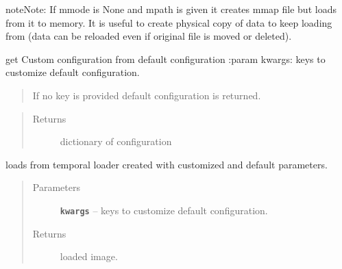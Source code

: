 \documentclass[letterpaper,10pt,english]{sphinxmanual}
\begin{document}
\begin{fulllineitems}
\begin{quote}
\begin{description}
\begin{itemize}
\end{itemize}

\end{description}\end{quote}

\begin{notice}{note}{Note:}
If mmode is None and mpath is given it creates mmap file but loads from it to memory.
It is useful to create physical copy of data to keep loading from (data can be reloaded
even if original file is moved or deleted).
\end{notice}

\begin{fulllineitems}
\label{RRtoolbox.lib:RRtoolbox.lib.image.imLoader.getConfiguration}
get Custom configuration from default configuration
:param kwargs: keys to customize default configuration.
\begin{quote}

If no key is provided default configuration is returned.
\end{quote}
\begin{quote}\begin{description}
\item[{Returns}] \leavevmode
dictionary of configuration

\end{description}\end{quote}

\end{fulllineitems}


\begin{fulllineitems}
\label{RRtoolbox.lib:RRtoolbox.lib.image.imLoader.temp}
loads from temporal loader created with customized and default parameters.
\begin{quote}\begin{description}
\item[{Parameters}] \leavevmode
\textbf{\texttt{kwargs}} -- keys to customize default configuration.

\item[{Returns}] \leavevmode
loaded image.

\end{description}\end{quote}

\end{fulllineitems}


\end{fulllineitems}
\end{document}
